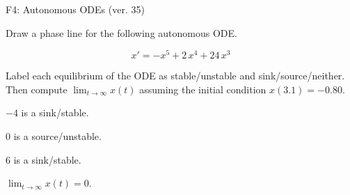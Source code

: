\begin{exercise}
  \begin{exerciseTitle}F4: Autonomous ODEs (ver. 35)\end{exerciseTitle}
  \begin{exerciseStatement}
    

      Draw a phase line for the following 
      autonomous ODE.
    

    
\[x'= -x^{5} + 2 \, x^{4} + 24 \, x^{3}\]

    

      Label each equilibrium of the ODE
      as stable/unstable and sink/source/neither.
      Then compute \(\lim_{t\to\infty}x(t)\)
      assuming the initial condition
      \(x( 3.1 )= -0.80\).
    

  \end{exerciseStatement}
  \begin{exerciseAnswer}
    

      \(-4\) is a sink/stable.
      
        \(0\) is a source/unstable.
      
      \(6\) is a sink/stable.
    

    

      \(\lim_{t\to\infty}x(t)=0\).
    

  \end{exerciseAnswer}
\end{exercise}